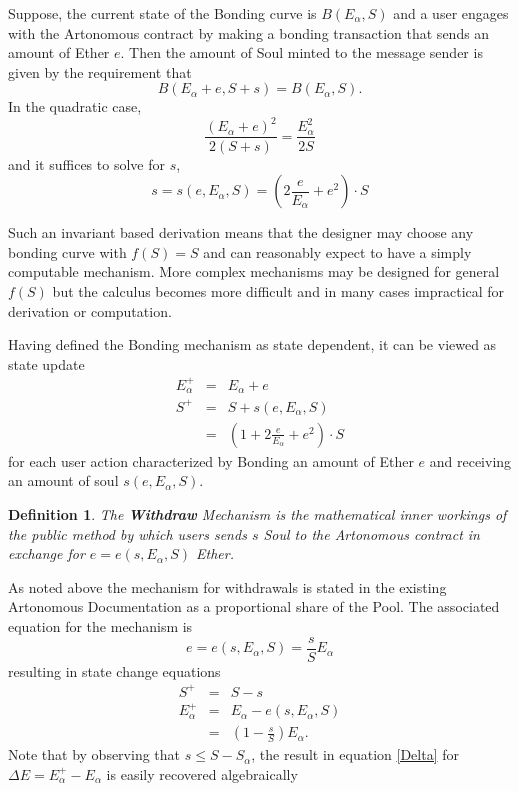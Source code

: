 \documentclass[11pt]{amsart}
\newtheorem{definition}{Definition}
\begin{document}
Suppose, the current state of the Bonding curve is $B(E_\alpha, S)$ and a user engages with the Artonomous contract by making a bonding transaction that sends an amount of Ether $e$. Then the amount of Soul minted to the message sender is given by the requirement that
\begin{equation}
B(E_\alpha+e, S+s) = B(E_\alpha, S).
\end{equation} 
In the quadratic case,
\begin{equation}
\frac{(E_\alpha+e)^2}{2(S+s)} = \frac{E_\alpha^2}{2S}
\end{equation} 
and it suffices to solve for $s$,
\begin{equation}
s = s(e,E_\alpha, S) = \left(2\frac{e}{E_\alpha}+e^2\right)\cdot S
\end{equation}

Such an invariant based derivation means that the designer may choose any bonding curve with $f(S)=S$ and can reasonably expect to have a simply computable mechanism. More complex mechanisms may be designed for general $f(S)$ but the calculus becomes more difficult and in many cases impractical for derivation or computation.

Having defined the Bonding mechanism as state dependent, it can be viewed as state update
\begin{eqnarray}
E_\alpha^+ &=& E_\alpha + e \\
S^+ &=& S+s(e,E_\alpha, S)\\
&=&  \left(1+2\frac{e}{E_\alpha}+e^2\right)\cdot S
\end{eqnarray}
for each user action characterized by Bonding an amount of Ether $e$ and receiving an amount of soul $s(e,E_\alpha, S)$.

\begin{definition}
The \textbf{Withdraw} Mechanism is the mathematical inner workings of the public method by which users sends $s$ Soul to the Artonomous contract in exchange for $e=e(s,E_\alpha, S)$ Ether. 
\end{definition}

As noted above the mechanism for withdrawals is stated in the existing Artonomous Documentation as a proportional share of the Pool. The associated equation for the mechanism is
\begin{equation}
e=e(s,E_\alpha, S) = \frac{s}{S} E_\alpha
\end{equation}
resulting in state change equations
\begin{eqnarray}
S^+ &=& S-s\\
E_\alpha^+ &=& E_\alpha - e(s,E_\alpha, S)\\
&=& \left(1-\frac{s}{S}\right) E_\alpha.
\end{eqnarray}
Note that by observing that $s\le S-S_\alpha$, the result in equation \eqref{Delta} for $\Delta E = E^+_\alpha - E_\alpha$ is easily recovered algebraically
\end{document}
